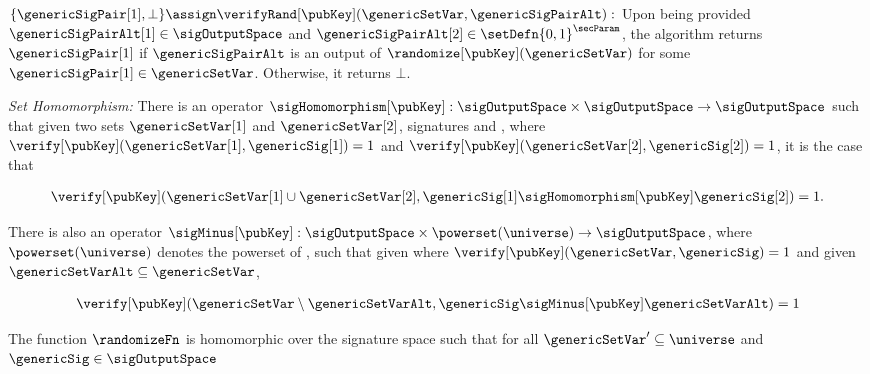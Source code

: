 \begin{definition}
		
		\item $\{\genericSigPair[1], \bot\} \assign  \verifyRand[\pubKey](\genericSetVar, \genericSigPairAlt):$ Upon 
being provided $\genericSigPairAlt[1] \in \sigOutputSpace$ and $\genericSigPairAlt[2] \in \setDefn{0,1}^{\secParam}$, the algorithm returns $\genericSigPair[1]$ if $\genericSigPairAlt$ is an output of $\randomize[\pubKey](\genericSetVar)$ for some $\genericSigPair[1] \in \genericSetVar$. Otherwise, it returns $\bot$. 
		
		
	\itemListEnd
	
	\smallskip
	\textit{Set Homomorphism:} There is an operator
	$\sigHomomorphism[\pubKey]:
	\sigOutputSpace \times \sigOutputSpace
	\rightarrow \sigOutputSpace$ such that given two sets
	$\genericSetVar[1]$ and $\genericSetVar[2]$, signatures
	\genericSig[1] and \genericSig[2], where
	$\verify[\pubKey](\genericSetVar[1], \genericSig[1]) = 1$ and
	$\verify[\pubKey](\genericSetVar[2], \genericSig[2]) = 1$, it
	is the case that
	
	
	\begin{align}
		\label{eq:sig_homomorphism_union}
		\verify[\pubKey](\genericSetVar[1] \cup \genericSetVar[2],
		\genericSig[1] \sigHomomorphism[\pubKey] \genericSig[2]) = 1.
	\end{align}
	
	There is also an operator $\sigMinus[\pubKey]: \sigOutputSpace
	\times \powerset(\universe) \rightarrow
	\sigOutputSpace$, where $\powerset(\universe)$ denotes the powerset
          of \universe, such that given \genericSig where
	$\verify[\pubKey](\genericSetVar, \genericSig) = 1$ and given
	$\genericSetVarAlt \subseteq \genericSetVar$,
	
	
	
	\begin{align}
		\verify[\pubKey](\genericSetVar \setminus \genericSetVarAlt,
		\genericSig \sigMinus[\pubKey] \genericSetVarAlt) = 1 
		\label{eq:sig_homomorphism_minus} 
			\end{align}
	

	The function $\randomizeFn$ is homomorphic over the signature space such that for all $\genericSetVar' \subseteq \universe$ and $\genericSig \in \sigOutputSpace$


\end{definition}
